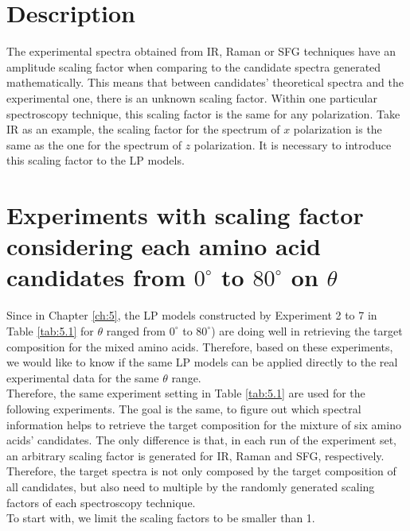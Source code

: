  \label{ch:6}
\section{Description}
The experimental spectra obtained from IR, Raman or SFG techniques have an amplitude scaling factor when comparing to the candidate spectra generated mathematically. This means that between candidates' theoretical spectra and the experimental one, there is an unknown scaling factor. Within one particular spectroscopy technique, this scaling factor is the same for any polarization. Take IR as an example, the scaling factor for the spectrum of $x$ polarization is the same as the one for the spectrum of $z$ polarization. It is necessary to introduce this scaling factor to the LP models. 

\section{Experiments with scaling factor considering each amino acid candidates from $0^{\circ}$ to $80^{\circ}$ on $\theta$}
Since in Chapter \ref{ch:5}, the LP models constructed by Experiment 2 to 7 in Table \ref{tab:5.1} for $\theta$ ranged from $0^{\circ}$ to $80^{\circ}$) are doing well in retrieving the target composition for the mixed amino acids. Therefore, based on these experiments, we would like to know if the same LP models can be applied directly to the real experimental data for the same $\theta$ range.\\

Therefore, the same experiment setting in Table \ref{tab:5.1} are used for the following experiments. The goal is the same, to figure out which spectral information helps to retrieve the target composition for the mixture of six amino acids' candidates. The only difference is that, in each run of the experiment set, an arbitrary scaling factor is generated for IR, Raman and SFG, respectively. Therefore, the target spectra is not only composed by the target composition of all candidates, but also need to multiple by the randomly generated scaling factors of each spectroscopy technique. \\

To start with, we limit the scaling factors to be smaller than 1. \\

